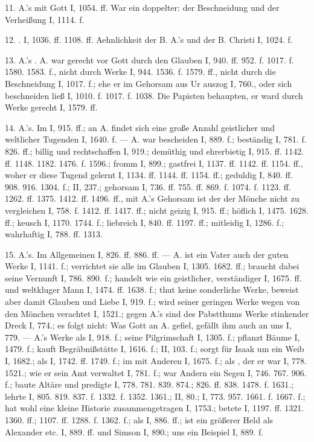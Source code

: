 11.  A.’s mit Gott I, 1054. ff. War ein doppelter: der Beschneidung und der Verheißung I, 1114. f.

12. . I, 1036. ff. 1108. ff. Aehnlichkeit der B. A.’s und der B. Christi I, 1024. f.

13.  A.’s . A. war gerecht vor Gott durch den Glauben I, 940. ff. 952. f. 1017. f. 1580. 1583. f., nicht durch Werke I, 944. 1536. f. 1579. ff., nicht durch die Beschneidung I, 1017. f.; ehe er im Gehorsam aus Ur auszog I, 760., oder sich beschneiden ließ I, 1010. f. 1017. f. 1038. Die Papisten behaupten, er ward durch Werke gerecht I, 1579. ff.

14.  A.’s. Im  I, 915. ff.; an A. findet sich eine große Anzahl geistlicher und weltlicher Tugenden I, 1640. f. — A. war bescheiden I, 889. f.; beständig I, 781. f. 826. ff.; billig und rechtschaffen I, 919.; demüthig und ehrerbietig I, 915. ff. 1142. ff. 1148. 1182. 1476. f. 1596.; fromm I, 899.; gastfrei I, 1137. ff. 1142. ff. 1154. ff., woher er diese Tugend gelernt I, 1134. ff. 1144. ff. 1154. ff.; geduldig I, 840. ff. 908. 916. 1304. f.; II, 237.; gehorsam I, 736. ff. 755. ff. 869. f. 1074. f. 1123. ff. 1262. ff. 1375. 1412. ff. 1496. ff., mit A.’s Gehorsam ist der der Mönche nicht zu vergleichen I, 758. f. 1412. ff. 1417. ff.; nicht geizig I, 915. ff.; höflich I, 1475. 1628. ff.; keusch I, 1170. 1744. f.; liebreich I, 840. ff. 1197. ff.; mitleidig I, 1286. f.; wahrhaftig I, 788. ff. 1313.

15.  A.’s. Im Allgemeinen I, 826. ff. 886. ff. — A. ist ein Vater auch der guten Werke I, 1141. f.; verrichtet sie alle im Glauben I, 1305. 1682. ff.; braucht dabei seine Vernunft I, 786. 890. f.; handelt wie ein geistlicher, verständiger I, 1675. ff. und weltkluger Mann I, 1474. ff. 1638. f.; thut keine sonderliche Werke, beweist aber damit Glauben und Liebe I, 919. f.; wird seiner geringen Werke wegen von den Mönchen verachtet I, 1521.; gegen A.’s sind des Pabstthums Werke stinkender Dreck I, 774.; es folgt nicht: Was Gott an A. gefiel, gefällt ihm auch an uns I, 779. — A.’s Werke als  I, 918. f.; seine Pilgrimschaft I, 1305. f.; pflanzt Bäume I, 1479. f.; kauft Begräbnißstätte I, 1616. f.; II, 103. f.; sorgt für Isaak um ein Weib I, 1682.; als  I, 1742. ff. 1749. f.; im  mit Anderen I, 1675. f.; als , der er war I, 778. 1521.; wie er sein Amt verwaltet I, 781. f.; war Andern ein Segen I, 746. 767. 906. f.; baute Altäre und predigte I, 778. 781. 839. 874.; 826. ff. 838. 1478. f. 1631.; lehrte I, 805. 819. 837. f. 1332. f. 1352. 1361.; II, 80.; I, 773. 957. 1661. f. 1667. f.; hat wohl eine kleine Historie zusammengetragen I, 1753.; betete I, 1197. ff. 1321. 1360. ff.; 1107. ff. 1288. f. 1362. f.; als  I, 886. ff.; ist ein größerer Held als Alexander etc. I, 889. ff. und Simson I, 890.; uns ein Beispiel I, 889. f.

